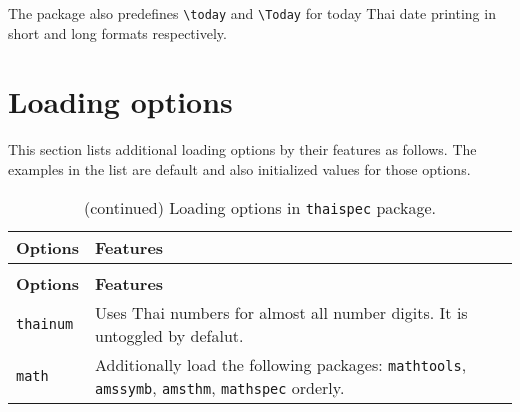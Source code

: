 \documentclass{article}
\begin{document}
The package also predefines \texttt{\textbackslash today} and \texttt{\textbackslash Today}
for today Thai date printing in short and long formats respectively.

\section{Loading options}
This section lists additional loading options by their features as follows.
The examples in the list are default and also initialized values for those options.
\renewcommand{\arraystretch}{1.8}
\begin{longtable}{l p{5.8cm}}
\caption{Loading options in \texttt{thaispec} package.} \label{table:loading_options}\\
\hline
\textbf{Options}  & \textbf{Features}
\\ \hline
\endfirsthead
\caption{(continued) Loading options in \texttt{thaispec} package.}\\
\hline
\textbf{Options}  & \textbf{Features}
\\ \hline
\endhead

\hline
\endfoot
  \texttt{thainum}
  & Uses Thai numbers for almost all number digits.
  It is untoggled by defalut.
  \\
  \texttt{math}
  & Additionally load the following packages:
  \texttt{mathtools}, \texttt{amssymb}, \texttt{amsthm}, \texttt{mathspec} orderly.


\end{longtable}
\end{document}

